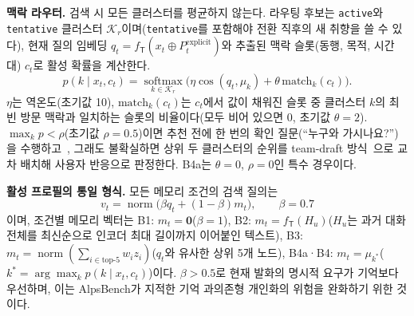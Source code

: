 \documentclass[10pt,twocolumn,letterpaper]{article}
\newcommand{\sT}{\mathsf{T}}
\newcommand{\cK}{\mathcal{K}}
\newcommand{\norm}{\operatorname{norm}}
\begin{document}
\textbf{맥락 라우터.} 검색 시 모든 클러스터를 평균하지 않는다. 라우팅 후보는 \texttt{active}와 \texttt{tentative} 클러스터 $\cK_r$이며(\texttt{tentative}를 포함해야 전환 직후의 새 취향을 쓸 수 있다), 현재 질의 임베딩 $q_t=f_\sT(x_t\oplus P_t^{\mathrm{explicit}})$와 추출된 맥락 슬롯(동행, 목적, 시간대) $c_t$로 활성 확률을 계산한다.
\begin{equation}
p(k\mid x_t,c_t)=\operatorname*{softmax}_{k\in\cK_r}\bigl(\eta\cos(q_t,\mu_k)+\theta\,\mathrm{match}_k(c_t)\bigr).
\label{eq:router}
\end{equation}
$\eta$는 역온도(초기값 10), $\mathrm{match}_k(c_t)$는 $c_t$에서 값이 채워진 슬롯 중 클러스터 $k$의 최빈 방문 맥락과 일치하는 슬롯의 비율이다(모두 비어 있으면 0, 초기값 $\theta=2$). $\max_kp<\rho$(초기값 $\rho=0.5$)이면 추천 전에 한 번의 확인 질문(``누구와 가시나요?'')을 수행하고~\cite{aliannejadi2019asking}, 그래도 불확실하면 상위 두 클러스터의 순위를 team-draft 방식~\cite{radlinski2008interleave}으로 교차 배치해 사용자 반응으로 판정한다. B4a는 $\theta=0$, $\rho=0$인 특수 경우이다.

\textbf{활성 프로필의 통일 형식.} 모든 메모리 조건의 검색 질의는
\begin{equation}
v_t=\norm\bigl(\beta q_t+(1-\beta)m_t\bigr),\qquad \beta=0.7
\label{eq:profile}
\end{equation}
이며, 조건별 메모리 벡터는 B1: $m_t=\mathbf{0}$($\beta=1$), B2: $m_t=f_\sT(H_u)$($H_u$는 과거 대화 전체를 최신순으로 인코더 최대 길이까지 이어붙인 텍스트), B3: $m_t=\norm(\sum_{i\in\mathrm{top}\text{-}5}w_iz_i)$($q_t$와 유사한 상위 5개 노드), B4a·B4: $m_t=\mu_{k^\ast}$($k^\ast=\arg\max_kp(k\mid x_t,c_t)$)이다. $\beta>0.5$로 현재 발화의 명시적 요구가 기억보다 우선하며, 이는 AlpsBench가 지적한 기억 과의존형 개인화의 위험을 완화하기 위한 것이다.
\end{document}
